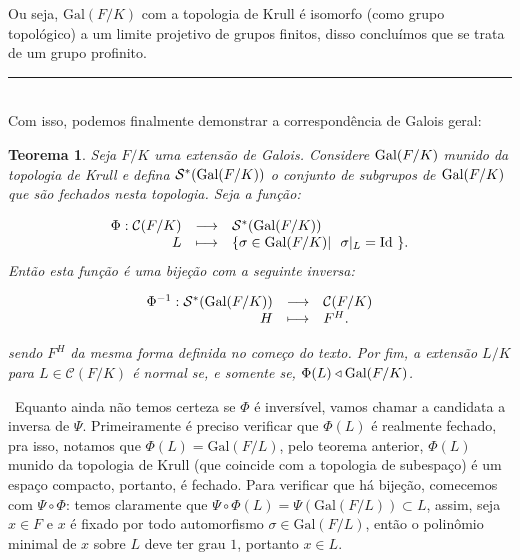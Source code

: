 \documentclass[12pt,a4paper]{article}
\newtheorem{thrm}[mydef]{Teorema}
\def\dem{\par\smallbreak\noindent {\textit{ Demonstração:}} \ }
\def\eop{\hfill\rule{2.5mm}{2.5mm} \\ }
\theoremstyle{definition}
\begin{document}
Ou seja,  $\text{Gal}(F/K)$ com a topologia de Krull é isomorfo (como grupo topológico) a um limite projetivo de grupos finitos, disso concluímos que se trata de um grupo profinito.   \eop

Com isso, podemos finalmente demonstrar a correspondência de Galois geral: 

\begin{thrm}

    Seja $F/K$ uma extensão de Galois. Considere $\text{\upshape Gal\itshape}(F/K)$ munido da topologia de Krull e defina $\mathcal{S}^*(\text{\upshape Gal\itshape}(F/K))$ o conjunto de subgrupos de $\text{\upshape Gal\itshape}(F/K)$ que são fechados nesta topologia. Seja a função:
    
    $$\begin{array}{rcl}
        \Phi: \mathcal{C}(F/K) & \longrightarrow & \mathcal{S}^*(\text{\upshape Gal\itshape}(F/K)) \\
         L &\longmapsto & \{\sigma \in \text{\upshape Gal\itshape}(F/K) |\ \ \sigma|_{L}=\text{\upshape Id \itshape } \}.
    \end{array}$$
    Então esta função é uma bijeção com a seguinte inversa:
    
    $$\begin{array}{rcl}
        \Phi^{-1}: \mathcal{S}^*(\text{\upshape Gal\itshape}(F/K)) & \longrightarrow & \mathcal{C}(F/K) \\
         H &\longmapsto & F^H.
    \end{array}$$
    
    sendo $F^H$ da mesma forma definida no começo do texto. Por fim, a extensão $L/K$ para $L\in  \mathcal{C}(F/K)$ é normal se, e somente se, $\Phi(L)\triangleleft \text{\upshape Gal\itshape}(F/K)$.

\end{thrm}

\dem Equanto ainda não temos certeza se $\Phi$ é inversível, vamos chamar a candidata a inversa de $\Psi$. Primeiramente é preciso verificar que $\Phi(L)$ é realmente fechado, pra isso, notamos que $\Phi(L)=\text{Gal}(F/L)$, pelo teorema anterior, $\Phi(L)$ munido da topologia de Krull (que coincide com a topologia de subespaço) é um espaço compacto, portanto, é fechado. Para verificar que há bijeção, comecemos com $\Psi \circ \Phi$: temos claramente que $\Psi \circ \Phi(L)=\Psi (\text{Gal}(F/L))\subset L$, assim, seja $x\in F$ e $x$ é fixado por todo automorfismo $\sigma \in \text{Gal}(F/L)$, então o polinômio minimal de $x$ sobre $L$ deve ter grau $1$, portanto $x\in L$. 
\end{document}
